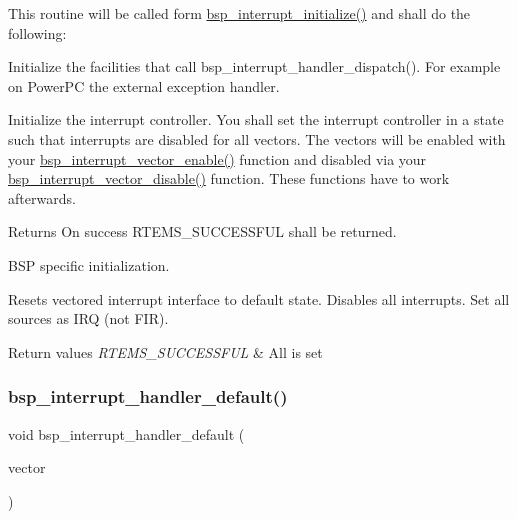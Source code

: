 This routine will be called form \mbox{\hyperlink{group__bsp__interrupt_gafccb8719531b51a8cf0163febeb42b29}{bsp\+\_\+interrupt\+\_\+initialize()}} and shall do the following\+:
\begin{DoxyItemize}
\item Initialize the facilities that call bsp\+\_\+interrupt\+\_\+handler\+\_\+dispatch(). For example on Power\+PC the external exception handler.
\item Initialize the interrupt controller. You shall set the interrupt controller in a state such that interrupts are disabled for all vectors. The vectors will be enabled with your \mbox{\hyperlink{group__bsp__interrupt_ga9968f1703b04b05f4f7e9fc5220da39a}{bsp\+\_\+interrupt\+\_\+vector\+\_\+enable()}} function and disabled via your \mbox{\hyperlink{group__bsp__interrupt_ga5428b914d0cb037e9b3f7cb2b758cabd}{bsp\+\_\+interrupt\+\_\+vector\+\_\+disable()}} function. These functions have to work afterwards.
\end{DoxyItemize}

\begin{DoxyReturn}{Returns}
On success R\+T\+E\+M\+S\+\_\+\+S\+U\+C\+C\+E\+S\+S\+F\+UL shall be returned.
\end{DoxyReturn}
B\+SP specific initialization.

Resets vectored interrupt interface to default state. Disables all interrupts. Set all sources as I\+RQ (not F\+IR).


\begin{DoxyRetVals}{Return values}
{\em R\+T\+E\+M\+S\+\_\+\+S\+U\+C\+C\+E\+S\+S\+F\+UL} & All is set \\
\hline
\end{DoxyRetVals}
\mbox{\label{group__bsp__interrupt_ga3f1754ddeb359b41b89f90ad7fd81d58}} 
\subsubsection{\texorpdfstring{bsp\_interrupt\_handler\_default()}{bsp\_interrupt\_handler\_default()}}
{\footnotesize\ttfamily void bsp\+\_\+interrupt\+\_\+handler\+\_\+default (\begin{DoxyParamCaption}\item[{\mbox{\hyperlink{group__ClassicINTR_ga3e434c197d99f128e78cae4d9358bd8b}{rtems\+\_\+vector\+\_\+number}}}]{vector }\end{DoxyParamCaption})}



